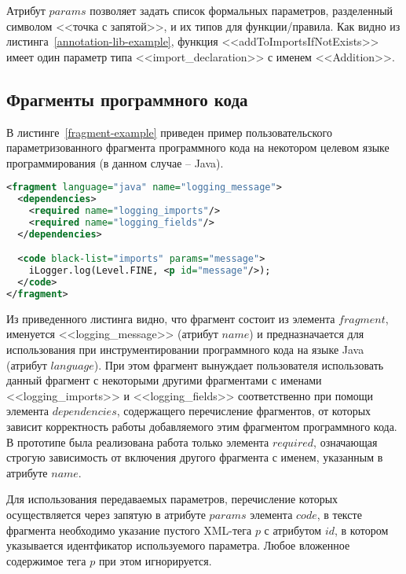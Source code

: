 Атрибут $params$ позволяет задать список формальных параметров, разделенный символом <<точка с запятой>>, и их типов для функции/правила.
Как видно из листинга~\ref{annotation-lib-example}, функция <<addToImportsIfNotExists>> имеет один параметр типа <<import\_declaration>> с именем <<Addition>>.

\subsection{Фрагменты программного кода}

В листинге~\ref{fragment-example} приведен пример пользовательского параметризованного фрагмента программного кода на некотором целевом языке программирования (в данном случае -- Java).

\begin{lstlisting}[frame=single, language=XML, label={fragment-example}, caption={Пример пользовательского фрагмента.}]
<fragment language="java" name="logging_message">
  <dependencies>
    <required name="logging_imports"/>
    <required name="logging_fields"/>
  </dependencies>

  <code black-list="imports" params="message">
    iLogger.log(Level.FINE, <p id="message"/>);
  </code>
</fragment>
\end{lstlisting}

Из приведенного листинга видно, что фрагмент состоит из элемента $fragment$, именуется <<logging\_message>> (атрибут $name$) и предназначается для использования при инструментировании программного кода на языке Java (атрибут $language$).
При этом фрагмент вынуждает пользователя использовать данный фрагмент с некоторыми другими фрагментами с именами <<logging\_imports>> и <<logging\_fields>> соответственно при помощи элемента $dependencies$, содержащего перечисление фрагментов, от которых зависит корректность работы добавляемого этим фрагментом программного кода.
В прототипе была реализована работа только элемента $required$, означающая строгую зависимость от включения другого фрагмента с именем, указанным в атрибуте $name$.

Для использования передаваемых параметров, перечисление которых осуществляется через запятую в атрибуте $params$ элемента $code$, в тексте фрагмента необходимо указание пустого XML-тега $p$ с атрибутом $id$, в котором указывается идентфикатор используемого параметра.
Любое вложенное содержимое тега $p$ при этом игнорируется.


